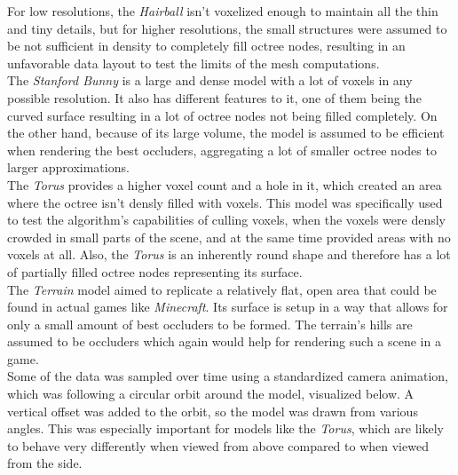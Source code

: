 \noindent
For low resolutions, the \emph{Hairball} isn't voxelized enough to maintain all the thin and tiny details, 
but for higher resolutions, the small structures were assumed to be not sufficient in density to completely
fill octree nodes, resulting in an unfavorable data layout to test the limits of the mesh computations. \\

\noindent
The \emph{Stanford Bunny} is a large and dense model with a lot of voxels in any possible resolution.
It also has different features to it, one of them being the curved surface resulting in a lot of octree 
nodes not being filled completely. On the other hand, because of its large volume, the model is assumed 
to be efficient when rendering the best occluders, aggregating a lot of smaller octree nodes to larger 
approximations. \\ 

\noindent
The \emph{Torus} provides a higher voxel count and a hole in it, which created an area where the 
octree isn't densly filled with voxels. This model was specifically used to test the algorithm's 
capabilities of culling voxels, when the voxels were densly crowded in small parts of the scene, and 
at the same time provided areas with no voxels at all. Also, the \emph{Torus} is an inherently round 
shape and therefore has a lot of partially filled octree nodes representing its surface. \\

\noindent
The \emph{Terrain} model aimed to replicate a relatively flat, open area that could be found in actual 
games like \emph{Minecraft}. Its surface is setup in a way that allows for only a small amount of best 
occluders to be formed. The terrain's hills are assumed to be occluders which again would help for rendering 
such a scene in a game. \\

\noindent
Some of the data was sampled over time using a standardized camera animation, which was following a circular orbit 
around the model, visualized below. A vertical offset was added to the orbit, so the model was drawn from various 
angles. This was especially important for models like the \emph{Torus}, which are likely to behave very differently 
when viewed from above compared to when viewed from the side.

